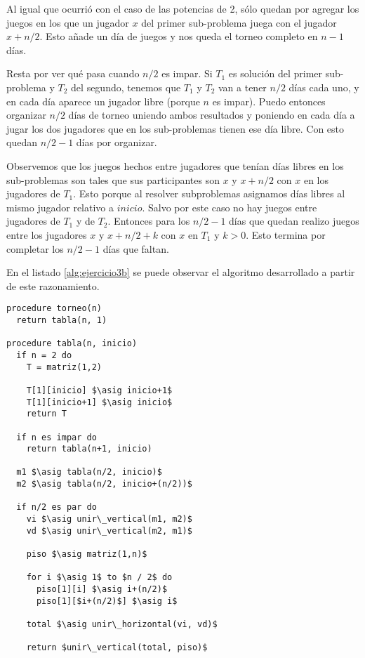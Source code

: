\documentclass{article}
\newcommand{\asig}{\ensuremath{\leftarrow}}
\begin{document}
\begin{itemize}
Al igual que ocurrió con el caso de las potencias de 2, sólo quedan por agregar
los juegos en los que un jugador $x$ del primer sub-problema
juega con el jugador $x+n/2$. Esto añade un día de juegos y nos queda el torneo
completo en $n-1$ días.

Resta por ver qué pasa cuando $n/2$ es impar. Si $T_1$ es solución del primer sub-problema
y $T_2$ del segundo, tenemos que $T_1$ y $T_2$ van a tener $n/2$ días cada uno, y en cada
día aparece un jugador libre (porque $n$ es impar). Puedo entonces organizar $n/2$ días
de torneo uniendo ambos resultados y poniendo en cada día a jugar los dos jugadores que
en los sub-problemas tienen ese día libre. Con esto quedan $n/2-1$ días por organizar.

Observemos que los juegos hechos entre jugadores que tenían días libres en los sub-problemas
son tales que sus participantes son $x$ y $x+n/2$ con $x$ en los jugadores de $T_1$. Esto
porque al resolver subproblemas asignamos días libres al mismo jugador relativo a $inicio$.
Salvo por este caso no hay juegos entre jugadores de $T_1$ y de $T_2$.
Entonces para los $n/2-1$ días que quedan realizo juegos entre los jugadores $x$ y $x+n/2+k$
con $x$ en $T_1$ y $k > 0$. Esto termina por completar los $n/2-1$ días que faltan.

En el listado \ref{alg:ejercicio3b} se puede observar
el algoritmo desarrollado a partir de este razonamiento.

\begin{lstlisting}[caption={Solución al ejercicio 2, caso general},label=alg:ejercicio3b]
procedure torneo(n)
  return tabla(n, 1)

procedure tabla(n, inicio)
  if n = 2 do
    T = matriz(1,2)

    T[1][inicio] $\asig inicio+1$
    T[1][inicio+1] $\asig inicio$
    return T

  if n es impar do
    return tabla(n+1, inicio)

  m1 $\asig tabla(n/2, inicio)$
  m2 $\asig tabla(n/2, inicio+(n/2))$

  if n/2 es par do
    vi $\asig unir\_vertical(m1, m2)$
    vd $\asig unir\_vertical(m2, m1)$

    piso $\asig matriz(1,n)$

    for i $\asig 1$ to $n / 2$ do
      piso[1][i] $\asig i+(n/2)$
      piso[1][$i+(n/2)$] $\asig i$

    total $\asig unir\_horizontal(vi, vd)$

    return $unir\_vertical(total, piso)$


\end{lstlisting}
\end{itemize}
\end{document}
